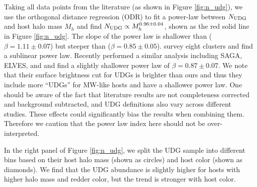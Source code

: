 \documentclass[twocolumn,astrosymb,twocolappendix]{aastex631}
\begin{document}
\begin{CJK*}{UTF8}{gbsn}
Taking all data points from the literature (as shown in Figure \ref{fig:n_udg}), we use the orthogonal distance regression (ODR) to fit a power-law between $N_{\rm UDG}$ and host halo mass $M_h$ and find $N_{\rm UDG} \propto M_h^{0.96\pm 0.04}$, shown as the red solid line in Figure \ref{fig:n_udg}. The slope of the power law is shallower than \citet{vdBurg2017} ($\beta=1.11\pm0.07$) but steeper than \citet{Roman2017b} ($\beta=0.85\pm0.05$). \citet{ManceraPina2018} survey eight clusters and find a sublinear power law. Recently \citet{Karunakaran2022b} performed a similar analysis including SAGA, ELVES, and \citet{Nashimoto2022} and find a slightly shallower power law of $\beta=0.87\pm0.07$. We note that their surface brightness cut for UDGs is brighter than ours and thus they include more ``UDGs'' for MW-like hosts and have a shallower power law. One should be aware of the fact that literature results are not completeness corrected and background subtracted, and UDG definitions also vary across different studies. These effects could significantly bias the results when combining them. Therefore we caution that the power law index here should not be over-interpreted. 

In the right panel of Figure \ref{fig:n_udg}, we split the UDG sample into different bins based on their host halo mass (shown as circles) and host color (shown as diamonds). We find that the UDG abundance is slightly higher for hosts with higher halo mass and redder color, but the trend is stronger with host color. 
\vspace{1em}


\end{CJK*}
\end{document}
